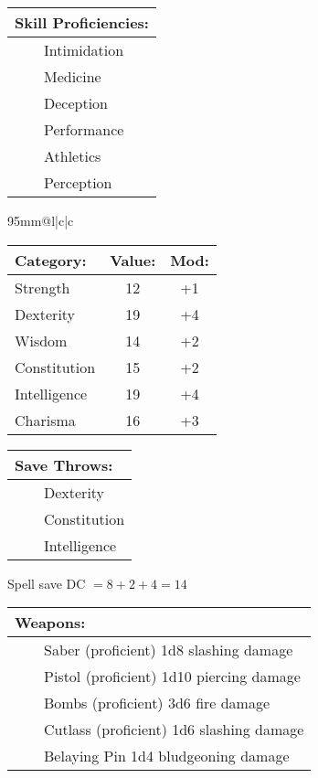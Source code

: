 \documentclass[11pt]{article}
\newcommand{\tabitem}{~~\llap{--}~~}
\begin{document}
\begin{multicols}{2}
\vspace{2mm}

\noindent \begin{tabularx}{95mm}{@{}l}
{\Large \textbf{Skill Proficiencies:}} \\
\hline
\tabitem Intimidation \\
\tabitem Medicine \\
\tabitem Deception \\
\tabitem Performance \\
\tabitem Athletics \\
\tabitem Perception
		\end{tabularx}

\vspace{4mm}

\noindent \begin{tabularx}{95mm}{@{}l|c|c}
 \\
\hline
		\end{tabularx}
\noindent \begin{tabular}{@{}l|c|c}
\textbf{Category:} 			& \textbf{Value:} 	& \textbf{Mod:} \\
\hline
Strength 					& 12	 				& +1		\\
Dexterity 					& 19	 				& +4		\\
Wisdom 						& 14					& +2		\\
Constitution 				& 15	 				& +2		\\
Intelligence 				& 19	 				& +4		\\
Charisma 					& 16	 				& +3
		\end{tabular}

\vspace{4mm}

\noindent \begin{tabularx}{95mm}{@{}l}
{\Large \textbf{Save Throws:}} \\
\hline
\tabitem Dexterity \\
\tabitem Constitution \\
\tabitem Intelligence \\
		\end{tabularx}
\noindent Spell save DC $= 8 + 2 + 4 = 14$

\vspace{4mm}

\noindent \begin{tabularx}{95mm}{@{}l}
{\Large \textbf{Weapons:}} \\
\hline
\tabitem Saber (proficient) 1d8 slashing damage \\
\tabitem Pistol (proficient) 1d10 piercing damage \\
\tabitem Bombs (proficient) 3d6 fire damage \\
\tabitem Cutlass (proficient) 1d6 slashing damage \\
\tabitem Belaying Pin 1d4 bludgeoning damage
		\end{tabularx}


\end{multicols}
\end{document}
